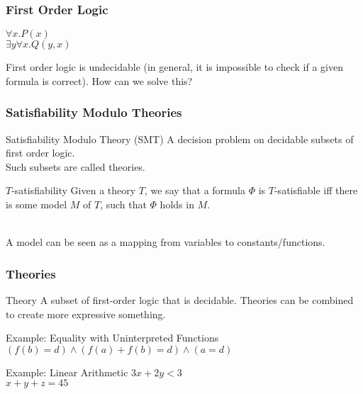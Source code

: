 \documentclass{beamer}
\makeatletter
\newcommand{\hl}{\textcolor{fibeamer@darkBlue} }
\theoremstyle{definition} %
\makeatother
\begin{document}
\begin{frame}
    \frametitle{First Order Logic}


    \begin{example}
        $\forall x.P(x)$\\
        $\exists y \forall x.Q(y, x)$\\
    \end{example}

    \pause
    First order logic is undecidable (in general, it is impossible to check if a given formula is correct).
    How can we solve this?
\end{frame}

\begin{frame}
    \frametitle{Satisfiability Modulo Theories}

    \begin{block}{Satisfiability Modulo Theory (SMT)}
        A decision problem on decidable subsets of first order logic.\\
        Such subsets are called theories.
    \end{block}

    \begin{block}{$T$-satisfiability}
        Given a theory \hl{$T$}, we say that a formula \hl{$\Phi$} is \hl{$T$}-satisfiable iff there is some model \hl{$M$} of \hl{$T$}, such that \hl{$\Phi$} holds in \hl{$M$}.
    \end{block}~\\

    A model can be seen as a mapping from variables to constants/functions.

\end{frame}

\begin{frame}
    \frametitle{Theories}

    \begin{block}{Theory}
        A subset of first-order logic that is decidable. Theories can be combined to create more expressive something. %
    \end{block}

    \begin{exampleblock}{Example: Equality with Uninterpreted Functions}
        $(f(b) = d) \wedge (f(a) + f(b) = d) \wedge (a = d)$
    \end{exampleblock}

    \begin{exampleblock}{Example: Linear Arithmetic}
        $3x + 2y < 3$\\
        $x + y + z = 45$
    \end{exampleblock}
\end{frame}
\end{document}
